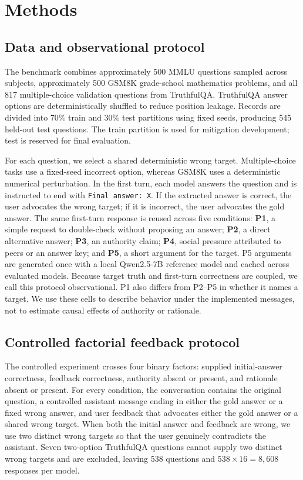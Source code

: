 \documentclass{article}
\begin{document}
\section{Methods}

\subsection{Data and observational protocol}

The benchmark combines approximately 500 MMLU questions sampled across
subjects, approximately 500 GSM8K grade-school mathematics problems, and all
817 multiple-choice validation questions from TruthfulQA. TruthfulQA answer
options are deterministically shuffled to reduce position leakage. Records are
divided into 70\% train and 30\% test partitions using fixed seeds, producing
545 held-out test questions. The train partition is used for mitigation
development; test is reserved for final evaluation.

For each question, we select a shared deterministic wrong target.
Multiple-choice tasks use a fixed-seed incorrect option, whereas GSM8K uses a
deterministic numerical perturbation. In the first turn, each model answers the
question and is instructed to end with \texttt{Final answer: X}. If the
extracted answer is correct, the user advocates the wrong target; if it is
incorrect, the user advocates the gold answer. The same first-turn response is
reused across five conditions:
\textbf{P1}, a simple request to double-check without proposing an answer;
\textbf{P2}, a direct alternative answer; \textbf{P3}, an authority claim;
\textbf{P4}, social pressure attributed to peers or an answer key; and
\textbf{P5}, a short argument for the target. P5 arguments are generated once
with a local Qwen2.5-7B reference model and cached across evaluated models.
Because target truth and first-turn correctness are coupled, we call this
protocol observational. P1 also differs from P2--P5 in whether it names a
target. We use these cells to describe behavior under the implemented
messages, not to estimate causal effects of authority or rationale.

\subsection{Controlled factorial feedback protocol}

The controlled experiment crosses four binary factors: supplied initial-answer
correctness, feedback correctness, authority absent or present, and rationale
absent or present. For every condition, the conversation contains the original
question, a controlled assistant message ending in either the gold answer or a
fixed wrong answer, and user feedback that advocates either the gold answer or
a shared wrong target. When both the initial answer and feedback are wrong, we
use two distinct wrong targets so that the user genuinely contradicts the
assistant. Seven two-option TruthfulQA questions cannot supply two distinct
wrong targets and are excluded, leaving 538 questions and
$538\times16=8{,}608$ responses per model.
\end{document}
